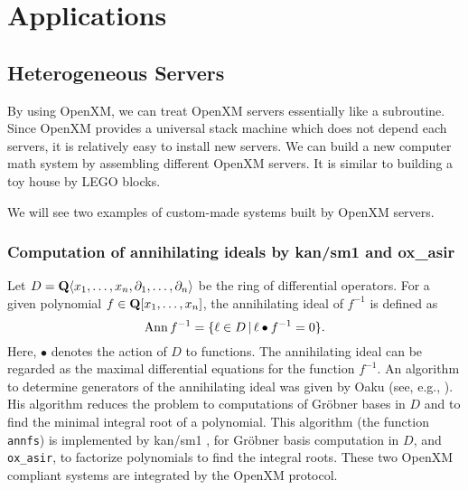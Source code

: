 \section{Applications}

\subsection{Heterogeneous Servers}

\def\pd#1{ \partial_{#1} }

By using OpenXM, we can treat OpenXM servers essentially 
like a subroutine.
Since OpenXM provides a universal stack machine which does not
depend each servers, 
it is relatively easy to install new servers.
We can build a new computer math system by assembling
different OpenXM servers.
It is similar to building a toy house by LEGO blocks.

We will see two examples of custom-made systems
built by OpenXM servers.

\subsubsection{Computation of annihilating ideals by kan/sm1 and ox\_asir}

Let $D = {\bf Q} \langle x_1, \ldots, x_n , \pd{1}, \ldots, \pd{n} \rangle$
be the ring of differential operators.
For a given polynomial
$ f \in {\bf Q}[x_1, \ldots, x_n] $,
the annihilating ideal of $f^{-1}$ is defined as
$$ {\rm Ann}\, f^{-1} = \{ \ell \in D \,|\,
  \ell \bullet f^{-1} = 0 \}.
$$
Here, $\bullet$ denotes the action of $D$ to functions.
The annihilating ideal can be regarded as the maximal differential
equations for the function $f^{-1}$.
An algorithm to determine generators of the annihilating ideal
was given by Oaku (see, e.g., \cite[5.3]{sst-book}).
His algorithm reduces the problem to computations of Gr\"obner bases
in $D$ and to find the minimal integral root of a polynomial.
This algorithm (the function {\tt annfs}) is implemented by
kan/sm1 \cite{kan}, for Gr\"obner basis computation in $D$, and
{\tt ox\_asir}, to factorize polynomials to find the integral
roots.
These two OpenXM compliant systems are integrated by
the OpenXM protocol.

%

